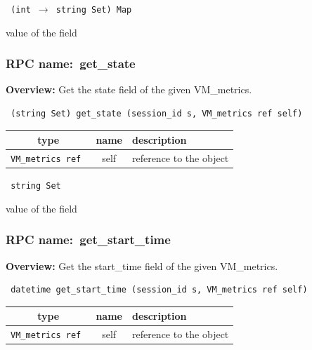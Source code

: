 \vspace{0.3cm}

{\tt 
(int $\rightarrow$ string Set) Map
}


value of the field
\vspace{0.3cm}
\vspace{0.3cm}
\vspace{0.3cm}
\subsubsection{RPC name:~get\_state}

{\bf Overview:} 
Get the state field of the given VM\_metrics.

\begin{verbatim} (string Set) get_state (session_id s, VM_metrics ref self)\end{verbatim}



 
\vspace{0.3cm}
\begin{tabular}{|c|c|p{7cm}|}
 \hline
{\bf type} & {\bf name} & {\bf description} \\ \hline
{\tt VM\_metrics ref } & self & reference to the object \\ \hline 

\end{tabular}

\vspace{0.3cm}

{\tt 
string Set
}


value of the field
\vspace{0.3cm}
\vspace{0.3cm}
\vspace{0.3cm}
\subsubsection{RPC name:~get\_start\_time}

{\bf Overview:} 
Get the start\_time field of the given VM\_metrics.

\begin{verbatim} datetime get_start_time (session_id s, VM_metrics ref self)\end{verbatim}



 
\vspace{0.3cm}
\begin{tabular}{|c|c|p{7cm}|}
 \hline
{\bf type} & {\bf name} & {\bf description} \\ \hline
{\tt VM\_metrics ref } & self & reference to the object \\ \hline 

\end{tabular}

